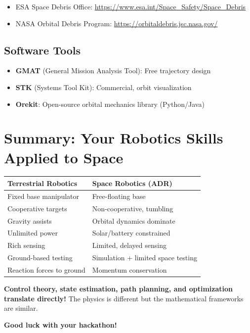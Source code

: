 \documentclass[11pt,a4paper]{article}
\begin{document}
\begin{itemize}[leftmargin=*]
    \item ESA Space Debris Office: \url{https://www.esa.int/Space_Safety/Space_Debris}
    \item NASA Orbital Debris Program: \url{https://orbitaldebris.jsc.nasa.gov/}
\end{itemize}

\subsection{Software Tools}

\begin{itemize}[leftmargin=*]
    \item \textbf{GMAT} (General Mission Analysis Tool): Free trajectory design
    \item \textbf{STK} (Systems Tool Kit): Commercial, orbit visualization
    \item \textbf{Orekit}: Open-source orbital mechanics library (Python/Java)
\end{itemize}

\section{Summary: Your Robotics Skills Applied to Space}

\begin{table}[h]
\centering
\begin{tabular}{|p{6cm}|p{6cm}|}
\hline
\textbf{Terrestrial Robotics} & \textbf{Space Robotics (ADR)} \\
\hline
Fixed base manipulator & Free-floating base \\
\hline
Cooperative targets & Non-cooperative, tumbling \\
\hline
Gravity assists & Orbital dynamics dominate \\
\hline
Unlimited power & Solar/battery constrained \\
\hline
Rich sensing & Limited, delayed sensing \\
\hline
Ground-based testing & Simulation + limited space testing \\
\hline
Reaction forces to ground & Momentum conservation \\
\hline
\end{tabular}
\end{table}

\vspace{1cm}

\begin{tcolorbox}[colback=green!5!white,colframe=green!50!black,title=Your Advantage]
\textbf{Control theory, state estimation, path planning, and optimization translate directly!} The physics is different but the mathematical frameworks are similar.
\end{tcolorbox}

\vspace{1cm}

\begin{center}
{\Large \textbf{Good luck with your hackathon!}}
\end{center}
\end{document}
